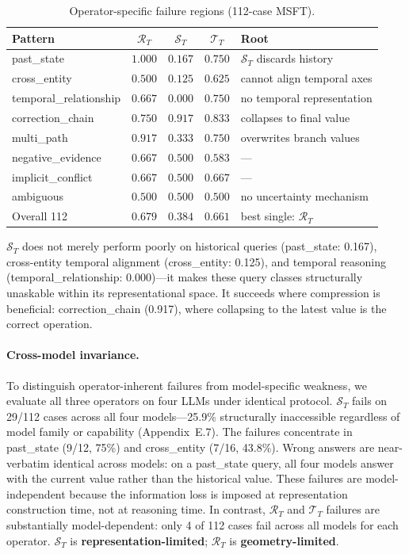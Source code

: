 \documentclass[letterpaper,twocolumn,10pt]{article}
\begin{document}
\begin{table}[t]
\caption{Operator-specific failure regions (112-case MSFT).}
\centering
\footnotesize
\begin{tabular}{lcccl}
\toprule
Pattern & $\mathcal{R}_T$ & $\mathcal{S}_T$ & $\mathcal{T}_T$ & Root\\
\midrule
past\_state & $\mathbf{1.000}$ & $0.167$ & $0.750$ & $\mathcal{S}_T$ discards history\\
cross\_entity & $0.500$ & $\mathbf{0.125}$ & $0.625$ & cannot align temporal axes\\
temporal\_relationship & $0.667$ & $\mathbf{0.000}$ & $0.750$ & no temporal representation\\
correction\_chain & $0.750$ & $\mathbf{0.917}$ & $0.833$ & collapses to final value\\
multi\_path & $\mathbf{0.917}$ & $0.333$ & $0.750$ & overwrites branch values\\
negative\_evidence & $0.667$ & $0.500$ & $0.583$ & ---\\
implicit\_conflict & $0.667$ & $0.500$ & $0.667$ & ---\\
ambiguous & $0.500$ & $0.500$ & $0.500$ & no uncertainty mechanism\\
\addlinespace
Overall 112 & $\mathbf{0.679}$ & $0.384$ & $0.661$ & best single: $\mathcal{R}_T$\\
\bottomrule
\end{tabular}
\end{table}

$\mathcal{S}_T$ does not merely perform poorly on historical queries (past\_state: 0.167), cross-entity temporal alignment (cross\_entity: 0.125), and temporal reasoning (temporal\_relationship: 0.000)---it makes these query classes structurally unaskable within its representational space. It succeeds where compression is beneficial: correction\_chain (0.917), where collapsing to the latest value is the correct operation.

\paragraph{Cross-model invariance.} To distinguish operator-inherent failures from model-specific weakness, we evaluate all three operators on four LLMs under identical protocol. $\mathcal{S}_T$ fails on 29/112 cases across all four models---25.9\% structurally inaccessible regardless of model family or capability (Appendix~E.7). The failures concentrate in past\_state (9/12, 75\%) and cross\_entity (7/16, 43.8\%). Wrong answers are near-verbatim identical across models: on a past\_state query, all four models answer with the current value rather than the historical value. These failures are model-independent because the information loss is imposed at representation construction time, not at reasoning time. In contrast, $\mathcal{R}_T$ and $\mathcal{T}_T$ failures are substantially model-dependent: only 4 of 112 cases fail across all models for each operator. $\mathcal{S}_T$ is \textbf{representation-limited}; $\mathcal{R}_T$ is \textbf{geometry-limited}.
\end{document}
